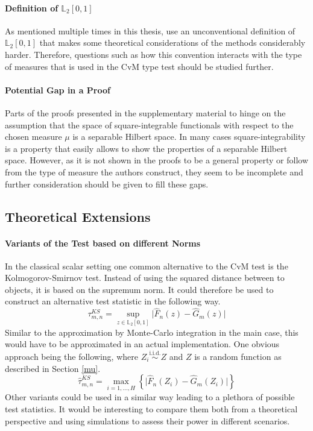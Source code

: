 \documentclass[12pt, a4paper]{article}
\theoremstyle{MAstyle} \newtheorem{assumption}{Assumption}[section]
\theoremstyle{MAstyle} \newtheorem{definition}{Definition}[section]
\theoremstyle{MAstyle} \newtheorem{theorem}{Theorem}[section]
\begin{document}
			\paragraph{Definition of $\mathbb{L}_2[0,1]$ \\}
				As mentioned multiple times in this thesis, \cite{bugni_permutation_2021} use an unconventional definition of $\mathbb{L}_2[0,1]$ that makes some theoretical considerations of the methods considerably harder. Therefore, questions such as how this convention interacts with the type of measures that is used in the CvM type test should be studied further. 
				
			\paragraph{Potential Gap in a Proof\\}
				Parts of the proofs presented in the supplementary material to \cite{bugni_permutation_2021} hinge on the assumption that the space of square-integrable functionals with respect to the chosen measure $\mu$ is a separable Hilbert space. In many cases square-integrability is a property that easily allows to show the properties of a separable Hilbert space. However, as it is not shown in the proofs to be a general property or follow from the type of measure the authors construct, they seem to be incomplete and further consideration should be given to fill these gaps.
	
		\subsection{Theoretical Extensions}
			\paragraph{Variants of the Test based on different Norms\\}
			In the classical scalar setting one common alternative to the CvM test is the Kolmogorov-Smirnov test. Instead of using the squared distance between to objects, it is based on the supremum norm. It could therefore be used to construct an alternative test statistic in the following way. 
			\begin{equation}
				\tau^{\textit{KS}}_{m,n} = \sup_{z \in \mathbb{L}_2[0,1]} \vert \hat{F}_n(z) - \hat{G}_m(z) \vert
			\end{equation}
			Similar to the approximation by Monte-Carlo integration in the main case, this would have to be approximated in an actual implementation. One obvious approach being the following, where $Z_i \stackrel{\text{i.i.d.}}{\sim} Z$ and $Z$ is a random function as described in Section \ref{mu}.
			\begin{equation}
				\hat{\tau}^{\textit{KS}}_{m,n} = \max_{i = 1, \dots, H}\left\{\vert \hat{F}_n(Z_i) - \hat{G}_m(Z_i) \vert \right\}
			\end{equation}
			Other variants could be used in a similar way leading to a plethora of possible test statistics. It would be interesting to compare them both from a theoretical perspective and using simulations to assess their power in different scenarios.
		
\end{document}
